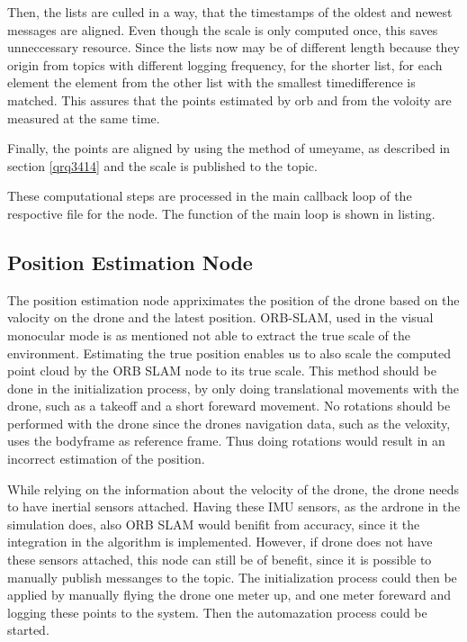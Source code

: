 	Then, the lists are culled in a way, that the timestamps of the oldest and newest messages are aligned. Even though the scale is only computed once, 
	this saves unneccessary resource. Since the lists now may be of different length because they origin from topics with different logging frequency, 
	for the shorter list, for each element the element from the other list with the smallest timedifference is matched. This assures that the points 
	estimated by orb and from the voloity are measured at the same time. 
	
	Finally, the points are aligned by using the method of umeyame, as described in section \ref{qrq3414} and the scale is published to the topic. 
	
	These computational steps are processed in the main callback loop of the respoctive file for the node. The function of the main loop is shown in listing.
	
	\subsection{Position Estimation Node}
	
	The position estimation node appriximates the position of the drone based on the valocity on the drone and the latest position. ORB-SLAM, used 
	in the visual monocular mode is as mentioned not able to extract the true scale of the environment. Estimating the true position enables us 
	to also scale the computed point cloud by the ORB SLAM node to its true scale. This method should be done in the initialization process, by 
	only doing translational movements with the drone, such as a takeoff and a short foreward movement. No rotations should be performed with the drone 
	since the drones navigation data, such as the veloxity, uses the bodyframe as reference frame. Thus doing rotations would result in an incorrect 
	estimation of the position. 
	
	While relying on the information about the 
	velocity of the drone, the drone needs to have inertial sensors attached. Having these IMU sensors, as the ardrone in the simulation does, also ORB SLAM would benifit from 
	accuracy, since it the integration in the algorithm is implemented. However, if drone does not have these sensors attached, 
	this node can still be of benefit, since it is possible to manually publish messanges to the topic. The initialization process could then be applied 
	by manually flying the drone one meter up, and one meter foreward and logging these points to the system. Then the automazation process could be started.
	
